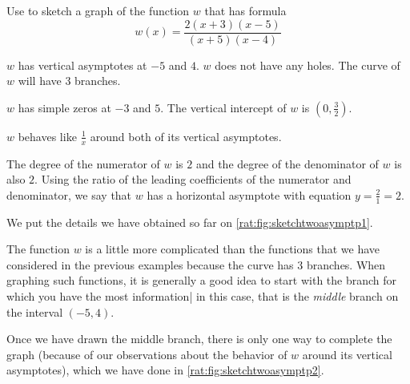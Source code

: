  \begin{pccexample}\label{rat:ex:sketchtwoasymp}
	 Use  to sketch a graph of the function $w$
	 that has formula
	 \[
		 w(x)=\frac{2(x+3)(x-5)}{(x+5)(x-4)}
	 \]
	 \begin{pccsolution}
		 \begin{steps}
			 \item $w$ has vertical asymptotes at $-5$ and $4$. $w$ does not have
			 any holes. The curve of $w$ will have $3$ branches.
			 \item $w$ has simple zeros at $-3$ and $5$. The vertical intercept of $w$
			 is $\left( 0,\frac{3}{2} \right)$.
			 \item $w$ behaves like $\frac{1}{x}$ around both of its vertical
			 asymptotes.
			 \item The degree of the numerator of $w$ is $2$ and the degree of the
			 denominator of $w$ is also $2$. Using the ratio of the leading coefficients
			 of the numerator and denominator, we say that $w$ has a horizontal
			 asymptote with equation $y=\frac{2}{1}=2$.
			 \item We put the details we have obtained so far on \cref{rat:fig:sketchtwoasymptp1}.

			 The function $w$ is a little more complicated than the functions that
			 we have considered in the previous examples because the curve has $3$
			 branches. When graphing such functions, it is generally a good idea to start with the branch
			 for which you have the most information| in this case, that is the \emph{middle} branch
			 on the interval $(-5,4)$.

			 Once we have drawn the middle branch, there is only one way to complete the graph
			 (because of our observations about the behavior of $w$ around its vertical asymptotes),
			 which we have done in \cref{rat:fig:sketchtwoasymptp2}.
		 \end{steps}
	 \end{pccsolution}
 \end{pccexample}

